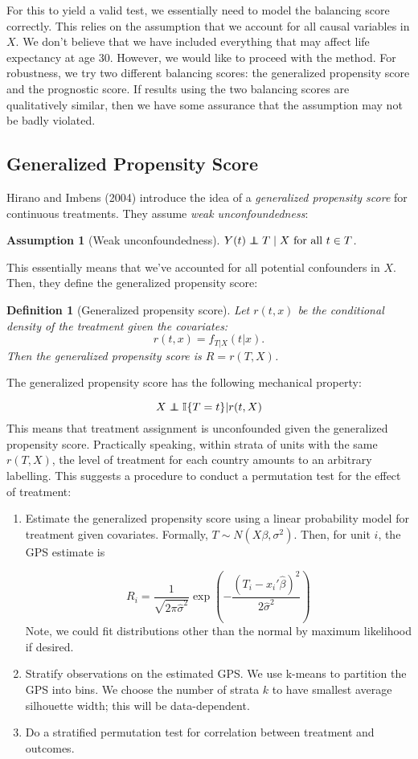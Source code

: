 \documentclass[11pt]{article}\usepackage[]{graphicx}\usepackage[]{color}
\newtheorem{assumption}{Assumption}
\newtheorem{definition}{Definition}
\newcommand{\ind}{\mathbb{I}} %
\newcommand{\normal}{N} %
\newcommand\independent{\protect\mathpalette{\protect\independenT}{\perp}}
\def\independenT#1#2{\mathrel{\rlap{$#1#2$}\mkern2mu{#1#2}}}
\begin{document}
For this to yield a valid test, we essentially need to model the balancing score correctly.
This relies on the assumption that we account for all causal variables in $X$.
We don't believe that we have included everything that may affect life expectancy at age 30.
However, we would like to proceed with the method.
For robustness, we try two different balancing scores: the generalized propensity score and the prognostic score.
If results using the two balancing scores are qualitatively similar, then we have some assurance that the assumption may not be badly violated.

\subsection{Generalized Propensity Score}
Hirano and Imbens (2004) introduce the idea of a \textit{generalized propensity score} for continuous treatments.
They assume \textit{weak unconfoundedness}:
\begin{assumption}[Weak unconfoundedness] $Y(t) \independent T \mid X \text{ for all } t \in T$.
\end{assumption}
This essentially means that we've accounted for all potential confounders in $X$.
Then, they define the generalized propensity score:

\begin{definition}[Generalized propensity score]
Let $r(t, x)$ be the conditional density of the treatment given the covariates:
$$r(t, x) = f_{T | X} (t|x).$$ 
Then the generalized propensity score is $R = r(T, X)$.
\end{definition}

The generalized propensity score has the following mechanical property:

$$X \independent \ind\{T = t\} \vert r(t, X)$$
This means that treatment assignment is unconfounded given the generalized propensity score.
Practically speaking, within strata of units with the same $r(T, X)$, the level of treatment for each country amounts to an arbitrary labelling.
This suggests a procedure to conduct a permutation test for the effect of treatment:
\begin{enumerate}
\item Estimate the generalized propensity score using a linear probability model for treatment given covariates.
Formally, $T \sim \normal(X\beta, \sigma^2)$.
Then, for unit $i$, the GPS estimate is

$$ R_i = \frac{1}{\sqrt{2\pi\hat{\sigma}^2}}\exp\left(-\frac{(T_i - x_i'\hat{\beta})^2}{2\hat{\sigma}^2}\right)$$
Note, we could fit distributions other than the normal by maximum likelihood if desired. 
\item Stratify observations on the estimated GPS. 
We use k-means to partition the GPS into bins. 
We choose the number of strata $k$ to have smallest average silhouette width; this will be data-dependent.
\item Do a stratified permutation test for correlation between treatment and outcomes.
\end{enumerate}
\end{document}
